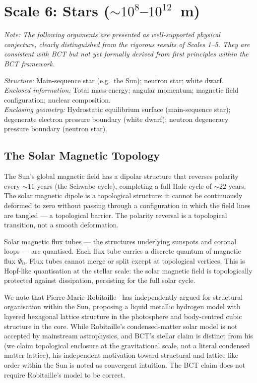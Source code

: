 \documentclass[aps,prl,preprint,superscriptaddress,floatfix]{revtex4-2}
\begin{document}
\section{Scale 6: Stars ($\sim 10^{8}$--$10^{12}$~m)}

\noindent\textit{Note: The following arguments are presented as
well-supported physical conjecture, clearly distinguished from the
rigorous results of Scales 1--5. They are consistent with BCT but
not yet formally derived from first principles within the BCT
framework.}

\vspace{4pt}

\textit{Structure:} Main-sequence star (e.g.\ the Sun); neutron
star; white dwarf.\\
\textit{Enclosed information:} Total mass-energy; angular momentum;
magnetic field configuration; nuclear composition.\\
\textit{Enclosing geometry:} Hydrostatic equilibrium surface
(main-sequence star); degenerate electron pressure boundary
(white dwarf); neutron degeneracy pressure boundary (neutron star).

\subsection{The Solar Magnetic Topology}

The Sun's global magnetic field has a dipolar structure that reverses
polarity every $\sim 11$ years (the Schwabe cycle), completing a
full Hale cycle of $\sim 22$ years. The solar magnetic dipole is
a topological structure: it cannot be continuously deformed to zero
without passing through a configuration in which the field lines are
tangled --- a topological barrier. The polarity reversal is a
topological transition, not a smooth deformation.

Solar magnetic flux tubes --- the structures underlying sunspots
and coronal loops --- are quantised. Each flux tube carries a
discrete quantum of magnetic flux $\Phi_0$. Flux tubes cannot
merge or split except at topological vertices. This is Hopf-like
quantisation at the stellar scale: the solar magnetic field is
topologically protected against dissipation, persisting for the
full solar cycle.

We note that Pierre-Marie Robitaille~\cite{robitaille2011} has
independently argued for structural organisation within the Sun,
proposing a liquid metallic hydrogen model with layered hexagonal
lattice structure in the photosphere and body-centred cubic structure
in the core. While Robitaille's condensed-matter solar model is not
accepted by mainstream astrophysics, and BCT's stellar claim is
distinct from his (we claim topological enclosure at the
gravitational scale, not a literal condensed matter lattice), his
independent motivation toward structural and lattice-like order
within the Sun is noted as convergent intuition. The BCT claim
does not require Robitaille's model to be correct.
\end{document}
